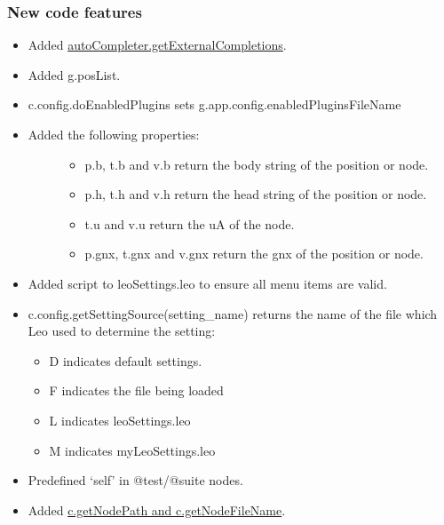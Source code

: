 \documentclass[a4paper,10pt,english]{sphinxmanual}
\begin{document}
\subsubsection{New code features}
\label{what-is-new:new-code-features}\begin{itemize}
\item {} 
Added \href{http://groups.google.com/group/leo-editor/browse\_thread/thread/4ad91984a6d0acac}{autoCompleter.getExternalCompletions}.

\item {} 
Added g.posList.

\item {} 
c.config.doEnabledPlugins sets g.app.config.enabledPluginsFileName

\item {} \begin{description}
\item[{Added the following properties:}] \leavevmode\begin{itemize}
\item {} 
p.b, t.b and v.b return the body string of the position or node.

\item {} 
p.h, t.h and v.h return the head string of the position or node.

\item {} 
t.u and v.u return the uA of the node.

\item {} 
p.gnx, t.gnx and v.gnx return the gnx of the position or node.

\end{itemize}

\end{description}

\item {} 
Added script to leoSettings.leo to ensure all menu items are valid.

\item {} 
c.config.getSettingSource(setting\_name)
returns the name of the file which Leo used to determine the setting:
\begin{itemize}
\item {} 
D indicates default settings.

\item {} 
F indicates the file being loaded

\item {} 
L indicates leoSettings.leo

\item {} 
M indicates myLeoSettings.leo

\end{itemize}

\item {} 
Predefined `self' in @test/@suite nodes.

\item {} 
Added \href{http://groups.google.com/group/leo-editor/browse\_thread/thread/3b5f1232ecc6bba7}{c.getNodePath and c.getNodeFileName}.

\end{itemize}
\end{document}
